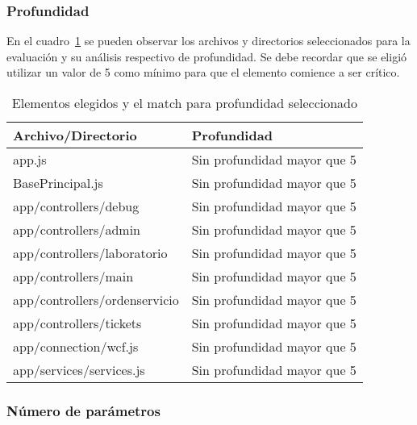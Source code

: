 \subsubsection{Profundidad}
En el cuadro~\ref{table:depth} se pueden observar los archivos y directorios 
seleccionados para la evaluación y su análisis respectivo de profundidad. Se 
debe recordar que se eligió utilizar un valor de 5 como mínimo para que el 
elemento comience a ser crítico.
\begin{table}[hb]
\centering
    \begin{tabular}{|l|l|}
    \hline
    \textbf{Archivo/Directorio}            & \textbf{Profundidad}                 \\ \hline
    app.js                        & Sin profundidad mayor que 5 \\ \hline
    BasePrincipal.js              & Sin profundidad mayor que 5 \\ \hline
    app/controllers/debug         & Sin profundidad mayor que 5 \\ \hline
    app/controllers/admin         & Sin profundidad mayor que 5 \\ \hline
    app/controllers/laboratorio   & Sin profundidad mayor que 5 \\ \hline
    app/controllers/main          & Sin profundidad mayor que 5 \\ \hline
    app/controllers/ordenservicio & Sin profundidad mayor que 5 \\ \hline
    app/controllers/tickets       & Sin profundidad mayor que 5 \\ \hline
    app/connection/wcf.js         & Sin profundidad mayor que 5 \\ \hline
    app/services/services.js      & Sin profundidad mayor que 5 \\ \hline
    \end{tabular}
    \caption{Elementos elegidos y el match para profundidad seleccionado}
    \label{table:depth}
\end{table}
\subsubsection{Número de parámetros}

